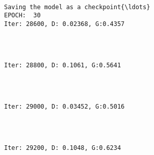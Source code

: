 \documentclass[11pt]{article}
\begin{document}
    \begin{Verbatim}[commandchars=\\\{\}]

Saving the model as a checkpoint{\ldots}
EPOCH:  30
Iter: 28600, D: 0.02368, G:0.4357
    \end{Verbatim}

    \begin{center}
    \end{center}
    { \hspace*{\fill} \\}
    
    \begin{Verbatim}[commandchars=\\\{\}]

Iter: 28800, D: 0.1061, G:0.5641
    \end{Verbatim}

    \begin{center}
    \end{center}
    { \hspace*{\fill} \\}
    
    \begin{Verbatim}[commandchars=\\\{\}]

Iter: 29000, D: 0.03452, G:0.5016
    \end{Verbatim}

    \begin{center}
    \end{center}
    { \hspace*{\fill} \\}
    
    \begin{Verbatim}[commandchars=\\\{\}]

Iter: 29200, D: 0.1048, G:0.6234
    \end{Verbatim}

    \begin{center}
    \end{center}
    { \hspace*{\fill} \\}
    
\end{document}

